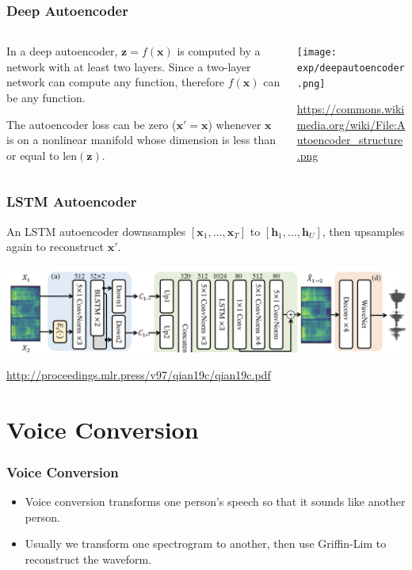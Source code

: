 \documentclass{beamer}
\begin{document}
\begin{frame}
  \frametitle{Deep Autoencoder}
  \begin{columns}
    \begin{column}{0.5\textwidth}
      In a deep autoencoder, $\bm{z}=f(\bm{x})$ is computed by a
      network with at least two layers.  Since a two-layer network can
      compute any function, therefore $f(\bm{x})$ can be any function.

      The autoencoder loss can be zero ($\bm{x'}=\bm{x}$) whenever
      $\bm{x}$ is on a nonlinear manifold whose dimension is less than or equal
      to $\text{len}(\bm{z})$.
    \end{column}
    \begin{column}{0.5\textwidth}
      \texttt{[image: exp/deepautoencoder.png]}

      \url{https://commons.wikimedia.org/wiki/File:Autoencoder_structure.png}
    \end{column}
  \end{columns}
\end{frame}

\begin{frame}
  \frametitle{LSTM Autoencoder}

  An LSTM autoencoder downsamples $[\bm{x}_1,\ldots,\bm{x}_T]$ to
  $[\bm{h}_1,\ldots,\bm{h}_U]$, then upsamples again to reconstruct $\bm{x'}$.
  
  \centerline{\includegraphics[width=\textwidth]{figs/lstmautoencoder.png}}

  \centerline{\url{http://proceedings.mlr.press/v97/qian19c/qian19c.pdf}}
\end{frame}

    
\section{Voice Conversion}
\setcounter{subsection}{1}

\begin{frame}
  \frametitle{Voice Conversion}

  \begin{itemize}
  \item Voice conversion transforms one person's speech so that it sounds like another person.
  \item Usually we transform one spectrogram to another, then use
    Griffin-Lim to reconstruct the waveform.
  \end{itemize}
\end{frame}
\end{document}
